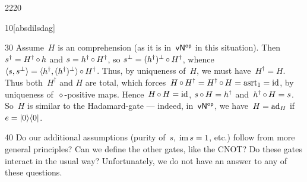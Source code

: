 \begin{parsec}{2220}
\begin{point}{10}[absdilsdag]
\begin{point}{30}
Assume~$H$ is an comprehension (as it is in~${\mathsf{vN}}{^{\mathsf{op}}}$ in this situation).
    Then~$s^\dagger = H^\dagger \mathop{\circ} h$ and
        $s = h^\dagger \mathop{\circ} H^\dagger$,
        so $s^\perp = (h^\dagger)^\perp \mathop{\circ} H^\dagger$,
        whence~$\langle s,s^\perp \rangle = \langle
                h^\dagger, (h^\dagger)^\perp \rangle \mathop{\circ} H^\dagger$.
Thus, by uniqueness of~$H$, we must have~$H^\dagger = H$.
Thus both~$H^\dagger$ and $H$ are total,
    which forces~$H\mathop{\circ} H^\dagger = H^\dagger \mathop{\circ} H = \mathrm{asrt}_{1} = \mathrm{id}$,
    by uniqueness of~$\diamond$-positive maps.
Hence~$H \mathop{\circ} H = \mathrm{id}$,
    $s \mathop{\circ} H = h^\dagger$
    and~$h^\dagger \mathop{\circ} H = s$.
    So~$H$ is similar to the Hadamard-gate
        --- indeed, in~${\mathsf{vN}}{^{\mathsf{op}}}$, we have~$H = \mathrm{ad}_H$ if~$e = \left|0\right>\!\left<0\right|$.
\end{point}
\begin{point}{40}%
Do our additional assumptions (purity of~$s$, $\operatorname{im} s = 1$, etc.)
follow from more general principles?  Can we define the other gates, like
    the CNOT? Do these gates interact in the usual way?
    Unfortunately, we do not have an answer to any of these questions.
\end{point}
\end{point}
\end{parsec}

